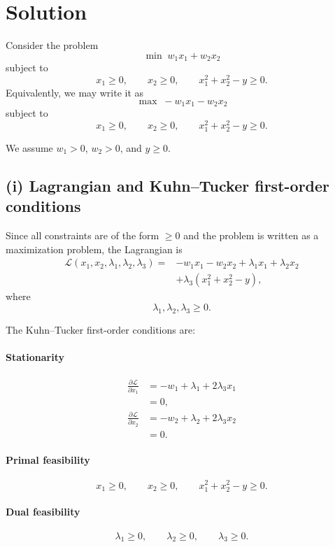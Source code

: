 \section*{Solution}

Consider the problem
\[
\min \; w_1x_1+w_2x_2
\]
subject to
\[
x_1\ge 0,\qquad x_2\ge 0,\qquad x_1^2+x_2^2-y\ge 0.
\]
Equivalently, we may write it as
\[
\max \; -w_1x_1-w_2x_2
\]
subject to
\[
x_1\ge 0,\qquad x_2\ge 0,\qquad x_1^2+x_2^2-y\ge 0.
\]

We assume \(w_1>0\), \(w_2>0\), and \(y\ge 0\).

\subsection*{(i) Lagrangian and Kuhn--Tucker first-order conditions}

Since all constraints are of the form \(\ge 0\) and the problem is written as a maximization problem, the Lagrangian is
\[
\begin{aligned}
\mathcal{L}(x_1,x_2,\lambda_1,\lambda_2,\lambda_3)
=
&-w_1x_1-w_2x_2
+\lambda_1x_1+\lambda_2x_2\\
&+\lambda_3(x_1^2+x_2^2-y),
\end{aligned}
\]
where
\[
\lambda_1,\lambda_2,\lambda_3\ge 0.
\]

The Kuhn--Tucker first-order conditions are:

\paragraph{Stationarity}
\[
\begin{aligned}
\frac{\partial \mathcal{L}}{\partial x_1}
&=
-w_1+\lambda_1+2\lambda_3x_1\\
&=0,
\end{aligned}
\]
\[
\begin{aligned}
\frac{\partial \mathcal{L}}{\partial x_2}
&=
-w_2+\lambda_2+2\lambda_3x_2\\
&=0.
\end{aligned}
\]

\paragraph{Primal feasibility}
\[
x_1\ge 0,\qquad x_2\ge 0,\qquad x_1^2+x_2^2-y\ge 0.
\]

\paragraph{Dual feasibility}
\[
\lambda_1\ge 0,\qquad \lambda_2\ge 0,\qquad \lambda_3\ge 0.
\]


